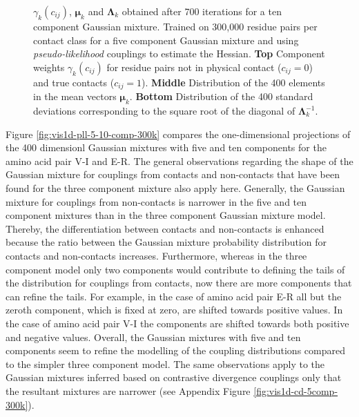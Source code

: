 \documentclass[11pt,a4paper,twoside]{book}
\newcommand{\eq}{\!=\!}
\newcommand{\Lk}{\mathbf{\Lambda}_k}
\newcommand{\muk}{\mathbf{\mu}_k}
\newcommand{\cij}{c_{ij}}
\theoremstyle{definition}
\theoremstyle{definition}
\theoremstyle{remark}
\begin{document}
\begin{figure}
{\(\gamma_k(\cij)\), \(\muk\) and \(\Lk\) obtained after 700 iterations
for a ten component Gaussian mixture. Trained on 300,000 residue pairs
per contact class for a five component Gaussian mixture and using
\emph{pseudo-likelihood} couplings to estimate the Hessian. \textbf{Top}
Component weights \(\gamma_k(\cij)\) for residue pairs not in physical
contact (\(\cij \eq 0\)) and true contacts (\(\cij \eq 1\)).
\textbf{Middle} Distribution of the 400 elements in the mean vectors
\(\muk\). \textbf{Bottom} Distribution of the 400 standard deviations
corresponding to the square root of the diagonal of \(\Lk^{-1}\).}\label{fig:stats-pll-10comp-300k}
\end{figure}

Figure \ref{fig:vis1d-pll-5-10-comp-300k} compares the one-dimensional
projections of the 400 dimensionl Gaussian mixtures with five and ten
components for the amino acid pair V-I and E-R. The general observations
regarding the shape of the Gaussian mixture for couplings from contacts
and non-contacts that have been found for the three component mixture
also apply here. Generally, the Gaussian mixture for couplings from
non-contacts is narrower in the five and ten component mixtures than in
the three component Gaussian mixture model. Thereby, the differentiation
between contacts and non-contacts is enhanced because the ratio between
the Gaussian mixture probability distribution for contacts and
non-contacts increases. Furthermore, whereas in the three component
model only two components would contribute to defining the tails of the
distribution for couplings from contacts, now there are more components
that can refine the tails. For example, in the case of amino acid pair
E-R all but the zeroth component, which is fixed at zero, are shifted
towards positive values. In the case of amino acid pair V-I the
components are shifted towards both positive and negative values.
Overall, the Gaussian mixtures with five and ten components seem to
refine the modelling of the coupling distributions compared to the
simpler three component model. The same observations apply to the
Gaussian mixtures inferred based on contrastive divergence couplings
only that the resultant mixtures are narrower (see Appendix Figure
\ref{fig:vis1d-cd-5comp-300k}).
\end{document}
